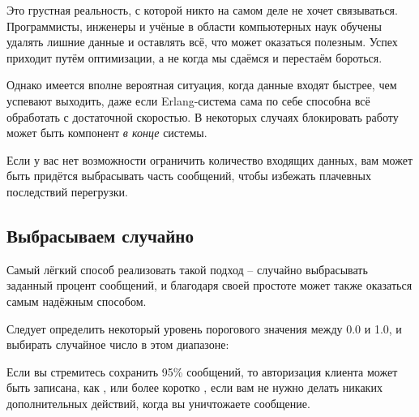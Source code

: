 \documentclass[11pt, oneside]{book}   	%
\begin{document}
Это грустная реальность, с которой никто на самом деле не хочет связываться. Программисты, инженеры и учёные в области компьютерных наук обучены удалять лишние данные и оставлять всё, что может оказаться полезным. Успех приходит  путём оптимизации, а не когда мы сдаёмся и перестаём бороться.

Однако имеется вполне вероятная ситуация, когда данные входят быстрее, чем успевают выходить, даже если Erlang-система сама по себе способна всё обработать с достаточной скоростью. В некоторых случаях блокировать работу может быть компонент \emph{в конце} системы.

Если у вас нет возможности ограничить количество входящих данных, вам может быть придётся выбрасывать часть сообщений, чтобы избежать плачевных последствий перегрузки.


\subsection{Выбрасываем случайно}

Самый лёгкий способ реализовать такой подход -- случайно выбрасывать заданный процент сообщений, и благодаря своей простоте может также оказаться самым надёжным способом.

Следует определить некоторый уровень порогового значения между 0.0 и 1.0, и выбирать случайное число в этом диапазоне:


Если вы стремитесь сохранить 95\% сообщений, то авторизация клиента может быть записана, как , или более коротко , если вам не нужно делать никаких дополнительных действий, когда вы уничтожаете сообщение.
\end{document}
